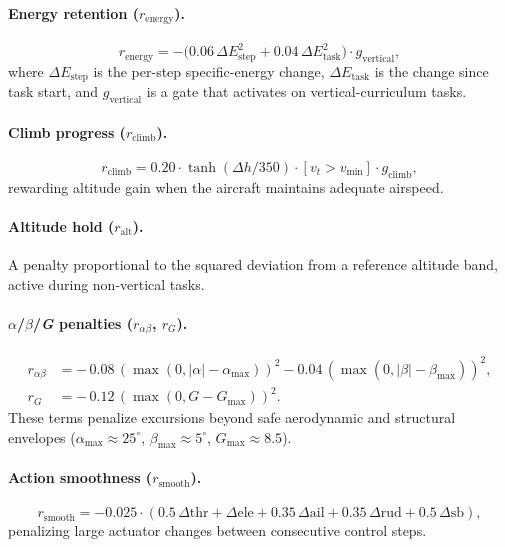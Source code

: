 \documentclass{article}
\begin{document}
\paragraph{Energy retention ($r_{\mathrm{energy}}$).}
\begin{equation}
  r_{\mathrm{energy}} = -\bigl(0.06\, \Delta E_{\mathrm{step}}^2
                        + 0.04\, \Delta E_{\mathrm{task}}^2\bigr)
                        \cdot g_{\mathrm{vertical}},
\end{equation}
where $\Delta E_{\mathrm{step}}$ is the per-step specific-energy change,
$\Delta E_{\mathrm{task}}$ is the change since task start, and
$g_{\mathrm{vertical}}$ is a gate that activates on vertical-curriculum
tasks.

\paragraph{Climb progress ($r_{\mathrm{climb}}$).}
\begin{equation}
  r_{\mathrm{climb}} = 0.20 \cdot \tanh(\Delta h / 350)
                       \cdot [v_t > v_{\min}]
                       \cdot g_{\mathrm{climb}},
\end{equation}
rewarding altitude gain when the aircraft maintains adequate airspeed.

\paragraph{Altitude hold ($r_{\mathrm{alt}}$).}
A penalty proportional to the squared deviation from a reference
altitude band, active during non-vertical tasks.

\paragraph{$\alpha$/$\beta$/\textit{G} penalties ($r_{\alpha\beta}$, $r_G$).}
\begin{align}
  r_{\alpha\beta} &= -\,0.08\,(\max(0, |\alpha| - \alpha_{\max}))^2
                     - 0.04\,(\max(0, |\beta| - \beta_{\max}))^2 ,\\
  r_{G}           &= -\,0.12\,(\max(0, G - G_{\max}))^2 .
\end{align}
These terms penalize excursions beyond safe aerodynamic and structural
envelopes ($\alpha_{\max} \approx 25^\circ$, $\beta_{\max} \approx 5^\circ$,
$G_{\max} \approx 8.5$).

\paragraph{Action smoothness ($r_{\mathrm{smooth}}$).}
\begin{equation}
  r_{\mathrm{smooth}} = -0.025 \cdot
    (0.5\,\Delta\mathrm{thr} + \Delta\mathrm{ele}
     + 0.35\,\Delta\mathrm{ail} + 0.35\,\Delta\mathrm{rud}
     + 0.5\,\Delta\mathrm{sb}),
\end{equation}
penalizing large actuator changes between consecutive control steps.
\end{document}
